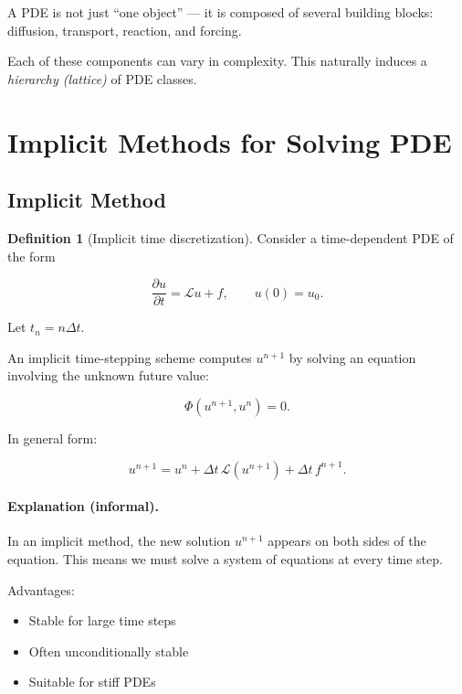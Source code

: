 \documentclass[11pt,a4paper,parskip=half-]{scrartcl}
\theoremstyle{definition}
\newtheorem{definition}{Definition}[section]
\theoremstyle{plain}
\theoremstyle{remark}
\begin{document}
A PDE is not just ``one object'' — it is composed of several building blocks:
diffusion, transport, reaction, and forcing.

Each of these components can vary in complexity. This naturally induces a
\emph{hierarchy (lattice)} of PDE classes.

\section{Implicit Methods for Solving PDE}

\subsection{Implicit Method}

\begin{definition}[Implicit time discretization]

  Consider a time-dependent PDE of the form

  \[
    \frac{\partial u}{\partial t} = \mathcal{L} u + f,
    \qquad u(0) = u_0.
  \]

  Let $t_n = n\Delta t$.

  An implicit time-stepping scheme computes $u^{n+1}$
  by solving an equation involving the unknown future value:

  \[
    \Phi(u^{n+1}, u^n) = 0.
  \]

  In general form:

  \[
    u^{n+1}
    =
    u^n
    +
    \Delta t \, \mathcal{L}(u^{n+1})
    +
    \Delta t \, f^{n+1}.
  \]

\end{definition}
\paragraph{Explanation (informal).}

In an implicit method, the new solution $u^{n+1}$ appears on both sides of the
equation. This means we must solve a system of equations at every time step.

Advantages:

\begin{itemize}
  \item Stable for large time steps
  \item Often unconditionally stable
  \item Suitable for stiff PDEs
\end{itemize}
\end{document}
